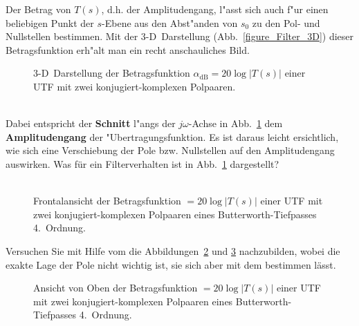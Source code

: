 {Der Betrag von $T(s)$, d.h. der Amplitudengang,  l"asst sich auch f"ur einen beliebigen Punkt der
$s$-Ebene aus den Abst"anden von $s_{0}$ zu den Pol- und Nullstellen
bestimmen.  Mit der 3-D~Darstellung (Abb.~\ref{figure_Filter_3D}) dieser Betragsfunktion
erh"alt man ein recht anschauliches Bild.
\begin{figure}[!htb]
\begin{center}
  \caption{3-D~Darstellung der Betragsfunktion $\alpha_{\text{dB}}=20\log{\left|T(s)\right|}$ einer UTF mit zwei konjugiert-komplexen Polpaaren.}\label{figure_Filter_3D}\label{Z_VER_ABB_3d}
\end{center}
\vspace*{-6mm}
\end{figure}\\
\nit Dabei entspricht der  {\bf Schnitt} l"angs der $j\omega$-Achse in Abb.~\ref{Z_VER_ABB_3d} dem
   {\bf Amplitudengang} der "Uber\-tragungs\-funktion.  Es ist
daraus leicht ersichtlich, wie sich eine Verschiebung der Pole bzw.
Nullstellen auf den Amplitudengang auswirken.
\aufg Was f\"ur ein Filterverhalten ist in Abb.~\ref{Z_VER_ABB_3d} dargestellt?\\~\\
\newpage
{}
\begin{figure}[!htb]%
\vspace*{-6mm}\begin{center}
  \caption{Frontalansicht der Betragsfunktion $=20\log{\left|T(s)\right|}$ einer UTF mit zwei konjugiert-komplexen Polpaaren eines Butterworth-Tiefpasses 4.~Ordnung.}\label{F_VER_ABB_GEBIRGE1}
\end{center}
\vspace*{-6mm}
\end{figure}
\aufg Versuchen Sie mit Hilfe vom  die Abbildungen~\ref{F_VER_ABB_GEBIRGE1} und \ref{F_VER_ABB_GEBIRGE2} nachzubilden, wobei die exakte Lage der Pole nicht wichtig ist, sie sich aber mit dem  bestimmen l\"asst. 
\begin{figure}[!htb]
\vspace*{-6mm}\begin{center}
  \caption{Ansicht von Oben der Betragsfunktion $=20\log{\left|T(s)\right|}$ einer UTF mit zwei konjugiert-komplexen Polpaaren eines Butterworth-Tiefpasses 4.~Ordnung.}\label{F_VER_ABB_GEBIRGE2}
\end{center}
\vspace*{-6mm}
\end{figure}

}
